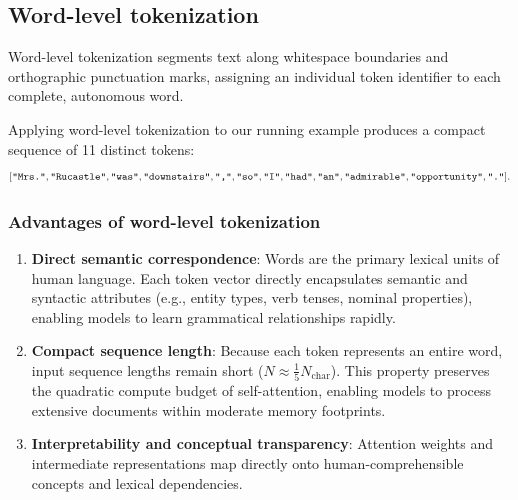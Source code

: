 \documentclass[../../main.tex]{subfiles}
\begin{document}
\subsection{Word-level tokenization}
\label{subsec:word_level_tokenization}

Word-level tokenization segments text along whitespace boundaries and orthographic punctuation marks, assigning an individual token identifier to each complete, autonomous word.

Applying word-level tokenization to our running example produces a compact sequence of 11 distinct tokens:
\begin{equation}
\label{eq:word_token_example}
[\text{\texttt{"Mrs."}}, \text{\texttt{"Rucastle"}}, \text{\texttt{"was"}}, \text{\texttt{"downstairs"}}, \text{\texttt{","}}, \text{\texttt{"so"}}, \text{\texttt{"I"}}, \text{\texttt{"had"}}, \text{\texttt{"an"}}, \text{\texttt{"admirable"}}, \text{\texttt{"opportunity"}}, \text{\texttt{"."}}].
\end{equation}

\subsubsection{Advantages of word-level tokenization}
\begin{enumerate}
    \item \textbf{Direct semantic correspondence}: Words are the primary lexical units of human language. Each token vector directly encapsulates semantic and syntactic attributes (e.g., entity types, verb tenses, nominal properties), enabling models to learn grammatical relationships rapidly.
    \item \textbf{Compact sequence length}: Because each token represents an entire word, input sequence lengths remain short ($N \approx \frac{1}{5} N_{\text{char}}$). This property preserves the quadratic compute budget of self-attention, enabling models to process extensive documents within moderate memory footprints.
    \item \textbf{Interpretability and conceptual transparency}: Attention weights and intermediate representations map directly onto human-comprehensible concepts and lexical dependencies.
\end{enumerate}
\end{document}
